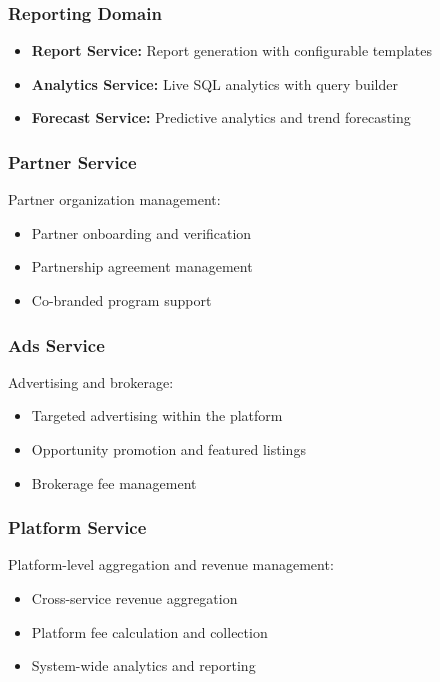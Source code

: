 \documentclass[11pt,a4paper]{article}
\begin{document}
\subsubsection{Reporting Domain}

\begin{itemize}
  \item \textbf{Report Service:} Report generation with configurable templates
  \item \textbf{Analytics Service:} Live SQL analytics with query builder
  \item \textbf{Forecast Service:} Predictive analytics and trend forecasting
\end{itemize}

\subsubsection{Partner Service}

Partner organization management:
\begin{itemize}
  \item Partner onboarding and verification
  \item Partnership agreement management
  \item Co-branded program support
\end{itemize}

\subsubsection{Ads Service}

Advertising and brokerage:
\begin{itemize}
  \item Targeted advertising within the platform
  \item Opportunity promotion and featured listings
  \item Brokerage fee management
\end{itemize}

\subsubsection{Platform Service}

Platform-level aggregation and revenue management:
\begin{itemize}
  \item Cross-service revenue aggregation
  \item Platform fee calculation and collection
  \item System-wide analytics and reporting
\end{itemize}
\end{document}
